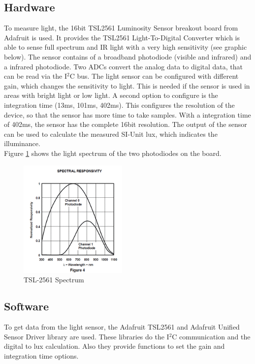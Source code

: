 \documentclass[fontsize=12pt,toc=bibliography, notitlepage]{scrreprt}
\begin{document}
\subsection{Hardware}
\label{subsec:light-intensity-sensor-hardware}
To measure light, the 16bit TSL2561 Luminosity Sensor breakout board from Adafruit is used.
It provides the TSL2561 Light-To-Digital Converter which is able to sense full spectrum and IR light with a very high sensitivity (see graphic below). The sensor contains of a broadband photodiode (visible and infrared) and a infrared photodiode. Two ADCs convert the analog data to digital data, that can be read via the I$^{2}$C bus. The light sensor can be configured with different gain, which changes the sensitivity to light. This is needed if the sensor is used in areas with bright light or low light. A second option to configure is the integration time (13ms, 101ms, 402ms). This configures the resolution of the device, so that the sensor has more time to take samples. With a integration time of 402ms, the sensor has the complete 16bit resolution. The output of the sensor can be used to calculate the measured SI-Unit lux, which indicates the illuminance.\cite{bib:tsl-sensor}\\
Figure \ref{fig:tsl-2561-spectrum} shows the light spectrum of the two photodiodes on the board.

\begin{figure}[H]
	\centering
	\includegraphics[width=200px]{images/light_tsl2561spectrum.png}
	\caption{TSL-2561 Spectrum}
	\label{fig:tsl-2561-spectrum}
\end{figure}

\subsection{Software}
\label{subsec:light-intensity-sensor-software}
To get data from the light sensor, the Adafruit TSL2561 and Adafruit Unified Sensor Driver library are used. These libraries do the I$^{2}$C communication and the digital to lux calculation. Also they provide functions to set the gain and integration time options. \cite{bib:tsl-library} \cite{bib:sensor-library}
\end{document}
